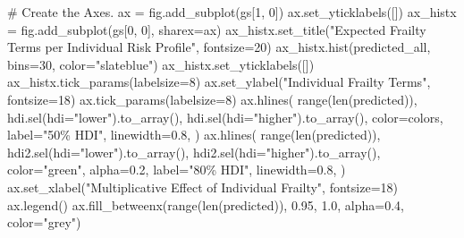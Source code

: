 \documentclass[
  letterpaper,
  DIV=11,
  numbers=noendperiod]{scrartcl}
\newenvironment{Shaded}{\begin{snugshade}}{\end{snugshade}}
\newcommand{\BuiltInTok}[1]{\textcolor[rgb]{0.00,0.23,0.31}{#1}}
\newcommand{\CommentTok}[1]{\textcolor[rgb]{0.37,0.37,0.37}{#1}}
\newcommand{\DecValTok}[1]{\textcolor[rgb]{0.68,0.00,0.00}{#1}}
\newcommand{\FloatTok}[1]{\textcolor[rgb]{0.68,0.00,0.00}{#1}}
\newcommand{\NormalTok}[1]{\textcolor[rgb]{0.00,0.23,0.31}{#1}}
\newcommand{\OperatorTok}[1]{\textcolor[rgb]{0.37,0.37,0.37}{#1}}
\newcommand{\StringTok}[1]{\textcolor[rgb]{0.13,0.47,0.30}{#1}}
\begin{document}
\begin{Shaded}
\begin{Highlighting}[]
\CommentTok{\# Create the Axes.}
\NormalTok{ax }\OperatorTok{=}\NormalTok{ fig.add\_subplot(gs[}\DecValTok{1}\NormalTok{, }\DecValTok{0}\NormalTok{])}
\NormalTok{ax.set\_yticklabels([])}
\NormalTok{ax\_histx }\OperatorTok{=}\NormalTok{ fig.add\_subplot(gs[}\DecValTok{0}\NormalTok{, }\DecValTok{0}\NormalTok{], sharex}\OperatorTok{=}\NormalTok{ax)}
\NormalTok{ax\_histx.set\_title(}\StringTok{"Expected Frailty Terms per Individual Risk Profile"}\NormalTok{, fontsize}\OperatorTok{=}\DecValTok{20}\NormalTok{)}
\NormalTok{ax\_histx.hist(predicted\_all, bins}\OperatorTok{=}\DecValTok{30}\NormalTok{, color}\OperatorTok{=}\StringTok{"slateblue"}\NormalTok{)}
\NormalTok{ax\_histx.set\_yticklabels([])}
\NormalTok{ax\_histx.tick\_params(labelsize}\OperatorTok{=}\DecValTok{8}\NormalTok{)}
\NormalTok{ax.set\_ylabel(}\StringTok{"Individual Frailty Terms"}\NormalTok{, fontsize}\OperatorTok{=}\DecValTok{18}\NormalTok{)}
\NormalTok{ax.tick\_params(labelsize}\OperatorTok{=}\DecValTok{8}\NormalTok{)}
\NormalTok{ax.hlines(}
    \BuiltInTok{range}\NormalTok{(}\BuiltInTok{len}\NormalTok{(predicted)),}
\NormalTok{    hdi.sel(hdi}\OperatorTok{=}\StringTok{"lower"}\NormalTok{).to\_array(),}
\NormalTok{    hdi.sel(hdi}\OperatorTok{=}\StringTok{"higher"}\NormalTok{).to\_array(),}
\NormalTok{    color}\OperatorTok{=}\NormalTok{colors,}
\NormalTok{    label}\OperatorTok{=}\StringTok{"50\% HDI"}\NormalTok{,}
\NormalTok{    linewidth}\OperatorTok{=}\FloatTok{0.8}\NormalTok{,}
\NormalTok{)}
\NormalTok{ax.hlines(}
    \BuiltInTok{range}\NormalTok{(}\BuiltInTok{len}\NormalTok{(predicted)),}
\NormalTok{    hdi2.sel(hdi}\OperatorTok{=}\StringTok{"lower"}\NormalTok{).to\_array(),}
\NormalTok{    hdi2.sel(hdi}\OperatorTok{=}\StringTok{"higher"}\NormalTok{).to\_array(),}
\NormalTok{    color}\OperatorTok{=}\StringTok{"green"}\NormalTok{,}
\NormalTok{    alpha}\OperatorTok{=}\FloatTok{0.2}\NormalTok{,}
\NormalTok{    label}\OperatorTok{=}\StringTok{"80\% HDI"}\NormalTok{,}
\NormalTok{    linewidth}\OperatorTok{=}\FloatTok{0.8}\NormalTok{,}
\NormalTok{)}
\NormalTok{ax.set\_xlabel(}\StringTok{"Multiplicative Effect of Individual Frailty"}\NormalTok{, fontsize}\OperatorTok{=}\DecValTok{18}\NormalTok{)}
\NormalTok{ax.legend()}
\NormalTok{ax.fill\_betweenx(}\BuiltInTok{range}\NormalTok{(}\BuiltInTok{len}\NormalTok{(predicted)), }\FloatTok{0.95}\NormalTok{, }\FloatTok{1.0}\NormalTok{, alpha}\OperatorTok{=}\FloatTok{0.4}\NormalTok{, color}\OperatorTok{=}\StringTok{"grey"}\NormalTok{)}


\end{Highlighting}
\end{Shaded}
\end{document}
